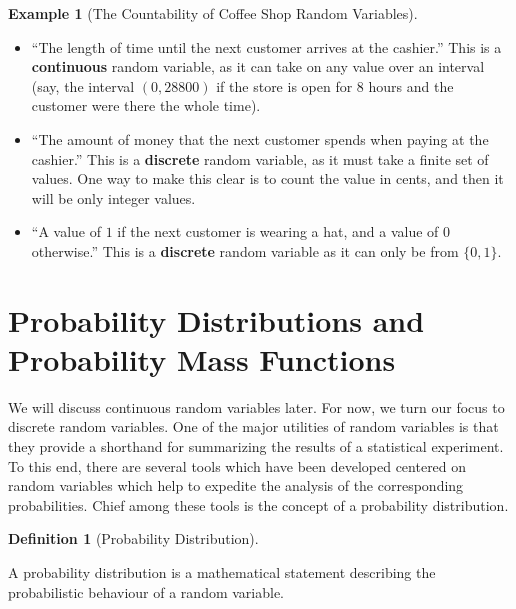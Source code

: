 \documentclass[
  letterpaper,
  DIV=11,
  numbers=noendperiod]{scrreprt}
\theoremstyle{definition}
\theoremstyle{definition}
\newtheorem{example}{Example}[chapter]
\theoremstyle{definition}
\newtheorem{definition}{Definition}[chapter]
\theoremstyle{remark}
\begin{document}
\begin{example}[The Countability of Coffee Shop Random
Variables]
\begin{tcolorbox}[enhanced jigsaw, colback=white, colframe=quarto-callout-color-frame, arc=.35mm, leftrule=.75mm, rightrule=.15mm, opacityback=0, breakable, bottomrule=.15mm, left=2mm, toprule=.15mm]
\begin{itemize}
  ``The number of words that the cashier says to the next customer,
  prior to payment.''

  ``A count of the number of red items of clothing that can be seen
  being worn by the next \(15\) customers.''

  These are all \textbf{discrete} random variables, as the only values
  they can take on are the counting integer values.
\item
  ``The length of time until the next customer arrives at the cashier.''
  This is a \textbf{continuous} random variable, as it can take on any
  value over an interval (say, the interval \((0,28800)\) if the store
  is open for \(8\) hours and the customer were there the whole time).
\item
  ``The amount of money that the next customer spends when paying at the
  cashier.'' This is a \textbf{discrete} random variable, as it must
  take a finite set of values. One way to make this clear is to count
  the value in cents, and then it will be only integer values.
\item
  ``A value of \(1\) if the next customer is wearing a hat, and a value
  of \(0\) otherwise.'' This is a \textbf{discrete} random variable as
  it can only be from \(\{0,1\}\).
\end{itemize}

\end{tcolorbox}

\end{example}

\section{Probability Distributions and Probability Mass
Functions}\label{probability-distributions-and-probability-mass-functions}

We will discuss continuous random variables later. For now, we turn our
focus to discrete random variables. One of the major utilities of random
variables is that they provide a shorthand for summarizing the results
of a statistical experiment. To this end, there are several tools which
have been developed centered on random variables which help to expedite
the analysis of the corresponding probabilities. Chief among these tools
is the concept of a probability distribution.

\begin{definition}[Probability
Distribution]\protect\hypertarget{def-probability-distribution}{}\label{def-probability-distribution}

A probability distribution is a mathematical statement describing the
probabilistic behaviour of a random variable.

\end{definition}
\end{document}
